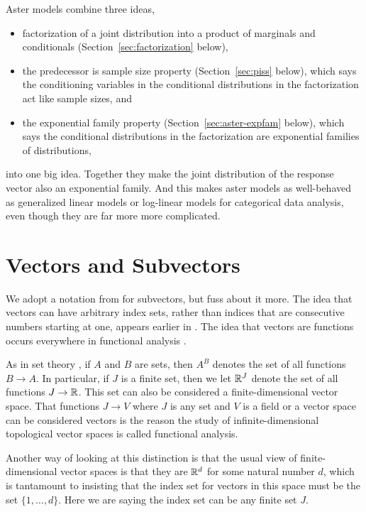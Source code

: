 Aster models combine three ideas,
\begin{itemize}
\item factorization of a joint distribution into a product of marginals
    and conditionals (Section~\ref{sec:factorization} below),
\item the predecessor is sample size property (Section~\ref{sec:piss} below),
    which says the conditioning variables in the conditional distributions
    in the factorization act like sample sizes, and
\item the exponential family property (Section~\ref{sec:aster-expfam} below),
    which says the conditional distributions in the factorization are
    exponential families of distributions,
\end{itemize}
into one big idea.  Together they make the joint distribution of the
response vector also an exponential family.  And this makes aster models
as well-behaved as generalized linear models or log-linear models for
categorical data analysis, even though they are far more more complicated.

\section{Vectors and Subvectors}
\label{sec:subvector}

We adopt a notation from \citet{lauritzen} for subvectors, but fuss about it
more.  The idea that vectors can have arbitrary index sets, rather than
indices that are consecutive numbers starting at one, appears earlier in
\citet{rockafellar-monotropic}.  The idea that vectors are functions
occurs everywhere in functional analysis \citep[Appendix~B]{rudin}.

As in set theory \citep[Section~8]{halmos-set-theory}, if $A$ and $B$
are sets, then $A^B$ denotes the set of all functions $B \to A$.
In particular, if $J$ is a finite set, then we let $\mathbb{R}^J$ denote
the set of all functions $J \to \mathbb{R}$.  This set can also be considered
a finite-dimensional vector space.  That functions $J \to V$ where $J$ is
any set and $V$ is a field or a vector space can be considered
vectors is the reason the study of infinite-dimensional topological vector
spaces is called functional analysis.

Another way of looking at this distinction is that the usual view of
finite-dimensional vector spaces is that they are $\mathbb{R}^d$ for some
natural number $d$, which is tantamount to insisting that the index
set for vectors in this space must be the set $\{1, \ldots, d\}$.
Here we are saying the index set can be any finite set $J$.

